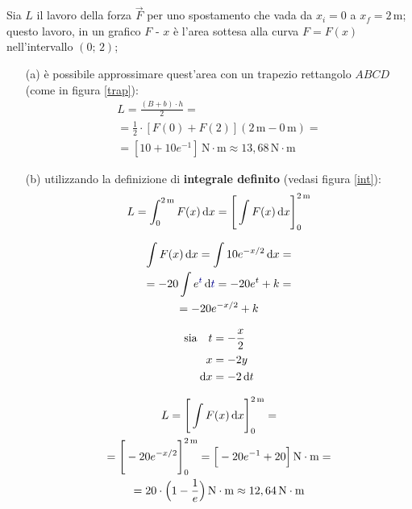 Sia $L$ il lavoro della forza $\vec{F}$ per uno spostamento che vada da $x_i=0$ a $x_f=2\,\text{m}$; questo lavoro, in un grafico $F$ - $x$ è l'area sottesa alla curva $F=F(x)$ nell'intervallo $(0;\,2)$;
\begin{itemize}
\item[(a)] \label{L:a} è possibile approssimare quest'area con un trapezio rettangolo $ABCD$ (come in figura \ref{trap}):
\begin{multline*}
L=\frac{(B+b)\cdot h}{2}=\\=\frac{1}{2}\cdot [F(0)+F(2)](2\,\text{m}-0\,\text{m})=\\=[10+10e^{-1}]\,\text{N}\cdot\text{m}\approx 13,68\,\text{N}\cdot\text{m}
\end{multline*}
\item [(b)] \label{L:b} utilizzando la definizione di \textbf{integrale definito} (vedasi figura \ref{int}):
\[
L=\int_{0}^{2\,\text{m}}F(x)\dif x=\Bigg[\int F(x) \dif x\Bigg]^{2\,\text{m}}_{0}
\]

\begin{minipage}{\textwidth}
\begin{tcolorbox}[colframe=blue!0!, colback=blue!3!, top=0mm, bottom=0mm]
\begin{multicols}{2}
\begin{gather*}
\int F(x) \dif x=\int 10e^{-x/2}\dif x=\\
=-20\int e^{\textcolor{blue}{t}}\dif \textcolor{blue}{t}=-20e^t+k=\\
=-20e^{-x/2}+k
\end{gather*}
\columnbreak

\begin{align*}
\text{sia}\quad t&=-\frac{x}{2}\\
x&=-2y\\
\dif x &= -2\dif t
\end{align*}
\end{multicols}
\end{tcolorbox}
\end{minipage}
\begin{multline*}
L=\Bigg[\int F(x) \dif x\Bigg]^{2\,\text{m}}_{0}=\\
=\Bigg[-20e^{-x/2}\Bigg]^{2\,\text{m}}_{0}=\Big[-20e^{-1}+20\Big]\,\text{N}\cdot\text{m}=\\
=20\cdot\Big(1-\frac{1}{e}\Big)\,\text{N}\cdot\text{m}\approx 12,64\,\text{N}\cdot\text{m}
\end{multline*}
\end{itemize}

